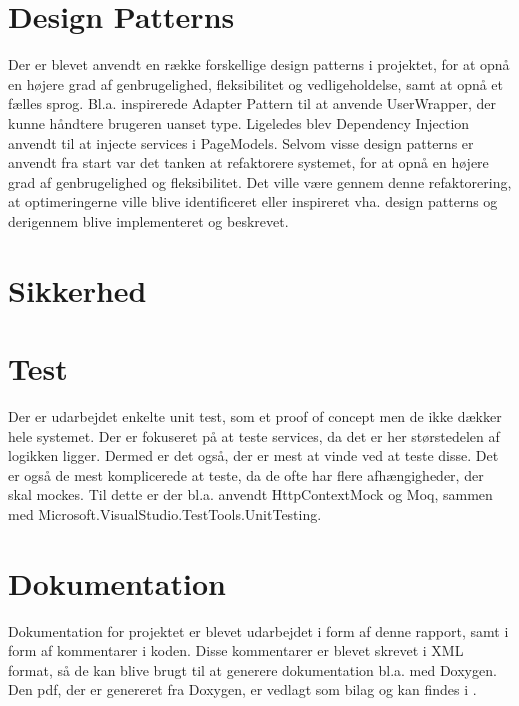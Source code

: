 \section{Design Patterns}
\label{sec:design-patterns}
Der er blevet anvendt en række forskellige design patterns i projektet, for at opnå en højere grad af genbrugelighed, fleksibilitet og vedligeholdelse, samt at opnå et fælles sprog.
Bl.a. inspirerede Adapter Pattern til at anvende UserWrapper, der kunne håndtere brugeren uanset type. Ligeledes blev Dependency Injection anvendt til at injecte services i PageModels.
Selvom visse design patterns er anvendt fra start var det tanken at refaktorere systemet, for at opnå en højere grad af genbrugelighed og fleksibilitet.
Det ville være gennem denne refaktorering, at optimeringerne ville blive identificeret eller inspireret vha. design patterns og derigennem blive implementeret og beskrevet.

\section{Sikkerhed}

\section{Test}
Der er udarbejdet enkelte unit test, som et proof of concept men de ikke dækker hele systemet. Der er fokuseret på at teste services, da det er her størstedelen af logikken ligger.
Dermed er det også, der er mest at vinde ved at teste disse. Det er også de mest komplicerede at teste, da de ofte har flere afhængigheder, der skal mockes. 
Til dette er der bl.a. anvendt HttpContextMock og Moq, sammen med Microsoft.VisualStudio.TestTools.UnitTesting.

\section{Dokumentation}
Dokumentation for projektet er blevet udarbejdet i form af denne rapport, samt i form af kommentarer i koden.
Disse kommentarer er blevet skrevet i XML format, så de kan blive brugt til at generere dokumentation bl.a. med Doxygen.
Den pdf, der er genereret fra Doxygen, er vedlagt som bilag og kan findes i .